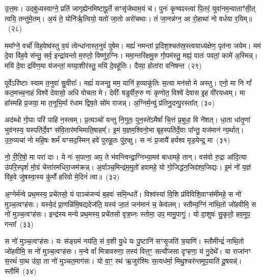 उ॒त्त॒मः। उद्बु॑ध्यस्वाग्ने॒ प्रति॑ जागृह्येनमिष्टापू॒र्ते सꣳसृ॑जेथाम॒यं च॑। पुनः॑ कृ॒ण्वꣴस्त्वा॑ पि॒तरं॒ युवा॑नम॒न्वाताꣳ॑सी॒त् त्वयि॒ तन्तु॑मे॒तम्। अ॒यं ते॒ योनि॑र्\mbox{}ऋ॒त्वियो॒ यतो॑ जा॒तो अरो॑चथाः। तं जा॒नन्न॑ग्न॒ आ रो॒हाथा॑ नो वर्धया र॒यिम्॥~(२८)

{\anuvakamend[{ध्रु॒वः स॒त्रं कृ॑णुते॒ यः स॒प्तत्रिꣳ॑शच्च}]}%

ममा᳚ग्ने॒ वर्चो॑ विह॒वेष्व॑स्तु व॒यं त्वेन्धा॑नास्त॒नुवं॑ पुषेम। मह्यं॑ नमन्तां प्र॒दिश॒श्चत॑स्र॒स्त्वयाध्य॑क्षेण॒ पृत॑ना जयेम। मम॑ दे॒वा वि॑ह॒वे स॑न्तु॒ सर्व॒ इन्द्रा॑वन्तो म॒रुतो॒ विष्णु॑र॒ग्निः। ममा॒न्तरि॑क्षमु॒रु गो॒पम॑स्तु॒ मह्यं॒ वातः॑ पवतां॒ कामे॑ अ॒स्मिन्न्। मयि॑ दे॒वा द्रवि॑ण॒मा य॑जन्तां॒ मय्या॒शीर॑स्तु॒ मयि॑ दे॒वहू॑तिः। दैव्या॒ होता॑रा वनिषन्त~(२९)

पूर्वे\-ऽरि॑ष्टाः स्याम त॒नुवा॑ सु॒वीराः᳚। मह्यं॑ यजन्तु॒ मम॒ यानि॑ ह॒व्याकू॑तिः स॒त्या मन॑सो मे अस्तु। एनो॒ मा नि गां᳚ कत॒मच्च॒नाहं विश्वे॑ देवासो॒ अधि॑ वोचता मे। देवीः᳚ षडुर्वीरु॒रु णः॑ कृणोत॒ विश्वे॑ देवास इ॒ह वी॑रयध्वम्। मा हा᳚स्महि प्र॒जया॒ मा त॒नूभि॒र्मा र॑धाम द्विष॒ते सो॑म राजन्न्। अ॒ग्निर्म॒न्युं प्र॑तिनु॒दन्पु॒रस्ता᳚त्~(३०)

अद॑ब्धो गो॒पाः परि॑ पाहि न॒स्त्वम्। प्र॒त्यञ्चो॑ यन्तु नि॒गुतः॒ पुन॒स्ते॑\-ऽमैषां᳚ चि॒त्तं प्र॒बुधा॒ वि ने॑शत्। धा॒ता धा॑तृ॒णां भुव॑नस्य॒ यस्पति॑र्दे॒वꣳ स॑वि॒तार॑मभिमाति॒षाहम्᳚। इ॒मं य॒ज्ञम॒श्विनो॒भा बृह॒स्पति॑र्दे॒वाः पा᳚न्तु॒ यज॑मानं न्य॒र्थात्। उ॒रु॒व्यचा॑ नो महि॒षः शर्म॑ यꣳसद॒स्मिन् हवे॑ पुरुहू॒तः पु॑रु॒क्षु। स नः॑ प्र॒जायै॑ हर्यश्व मृड॒येन्द्र॒ मा~(३१)

नो॒ री॒रि॒षो॒ मा परा॑ दाः। ये नः॑ स॒पत्ना॒ अप॒ ते भ॑वन्त्विन्द्रा॒ग्निभ्या॒मव॑ बाधामहे॒ तान्। वस॑वो रु॒द्रा आ॑दि॒त्या उ॑परि॒स्पृशं॑ मो॒ग्रं चेत्ता॑रमधिरा॒जम॑क्रन्न्। अ॒र्वाञ्च॒मिन्द्र॑म॒मुतो॑ हवामहे॒ यो गो॒जिद्ध॑न॒जिद॑श्व॒जिद्यः। इ॒मं नो॑ य॒ज्ञं वि॑ह॒वे जु॑षस्वा॒स्य कु॑र्मो हरिवो मे॒दिनं॑ त्वा॥~(३२)

{\anuvakamend[{व॒नि॒ष॒न्त॒ पु॒रस्ता॒न्मा त्रिच॑त्वारिꣳशच्च}]}%

अ॒ग्नेर्म॑न्वे प्रथ॒मस्य॒ प्रचे॑तसो॒ यं पाञ्च॑जन्यं ब॒हवः॑ समि॒न्धते᳚। विश्व॑स्यां वि॒शि प्र॑विविशि॒वाꣳस॑मीमहे॒ स नो॑ मुञ्च॒त्वꣳह॑सः। यस्ये॒दं प्रा॒णन्नि॑मि॒षद्यदेज॑ति॒ यस्य॑ जा॒तं जन॑मानं च॒ केव॑लम्। स्तौम्य॒ग्निं ना॑थि॒तो जो॑हवीमि॒ स नो॑ मुञ्च॒त्वꣳह॑सः। इन्द्र॑स्य मन्ये प्रथ॒मस्य॒ प्रचे॑तसो वृत्र॒घ्नः स्तोमा॒ उप॒ मामु॒पागुः॑। यो दा॒शुषः॑ सु॒कृतो॒ हव॒मुप॒ गन्ता᳚~(३३)

स नो॑ मुञ्च॒त्वꣳह॑सः। यः स॑ङ्ग्रमं नय॑ति॒ सं व॒शी यु॒धे यः पु॒ष्टानि॑ सꣳसृ॒जति॑ त्र॒याणि॑। स्तौमीन्द्रं॑ नाथि॒तो जो॑हवीमि॒ स नो॑ मुञ्च॒त्वꣳह॑सः। म॒न्वे वां᳚ मित्रावरुणा॒ तस्य॑ वित्त॒ꣳ॒ सत्यौ॑जसा दृꣳहणा॒ यं नु॒देथे᳚। या राजा॑नꣳ स॒रथं॑ या॒थ उ॑ग्रा॒ ता नो॑ मुञ्चत॒माग॑सः। यो वा॒ꣳ॒ रथ॑ ऋ॒जुर॑श्मिः स॒त्यध॑र्मा॒ मिथु॒श्चर॑न्तमुप॒याति॑ दू॒षयन्न्॑। स्तौमि॑~(३४)

